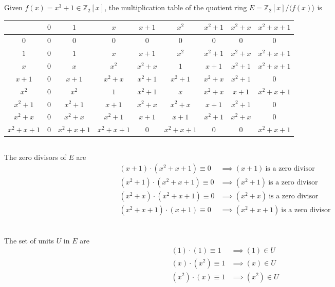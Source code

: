 \documentclass{article}
\begin{document}
\subsection{}
Given $f(x) = x^3 + 1 \in \mathbb{Z}_2[x]$, the multiplication table of the
quotient ring $E = \mathbb{Z}_2[x]/ \langle f(x)\rangle$ is
\begin{center}
\begin{tabular}{ c | c | c | c | c | c | c | c | c }
& $0$ & $1$ & $x$ & $x + 1$ & $x^2$ & $x^2 + 1$ & $x^2 + x$ & $x^2 + x + 1$ \\
\hline
$0$ & $0$ & $0$ & $0$ & $0$ & $0$ & $0$ & $0$ & $0$ \\
\hline
$1$ & $0$ & $1$ & $x$ & $x + 1$ & $x^2$ & $x^2 + 1$ & $x^2 + x$ & $x^2 + x + 1$ \\
\hline
$x$ & $0$ & $x$ & $x^2$ & $x^2 + x$ & $1$ & $x + 1$ & $x^2 + 1$ & $x^2 + x + 1$ \\
\hline
$x+1$ & $0$ & $x+1$ & $x^2 + x$ & $x^2 + 1$ & $x^2 + 1$ & $x^2 + x$ & $x^2 + 1$ & $0$ \\
\hline
$x^2$ & $0$ & $x^2$ & $1$ & $x^2 + 1$ & $x$ & $x^2 + x$ & $x + 1$ & $x^2 + x + 1$ \\
\hline
$x^2 + 1$ & $0$ & $x^2 + 1$ & $x+1$ & $x^2 + x$ & $x^2+x$ & $x + 1$ & $x^2 + 1$ & $0$ \\
\hline
$x^2 + x$ & $0$ & $x^2 + x$ & $x^2+1$ & $x + 1$ & $x+1$ & $x^2 + 1$ & $x^2 + x$ & $0$ \\
\hline
$x^2 + x + 1$ & $0$ & $x^2 + x + 1$ & $x^2+x+1$ & $0$ & $x^2+x+1$ & $0$ & $0$ & $x^2+x+1$ \\
\end{tabular}
\end{center}
\subsection{}
The zero divisors of $E$ are
\[
\begin{split}
(x+1) \cdot (x^2+x+1) \equiv 0 &\implies (x+1)\ \textrm{is a zero divisor} \\
(x^2+1) \cdot (x^2+x+1) \equiv 0 &\implies (x^2+1)\ \textrm{is a zero divisor} \\
(x^2+x) \cdot (x^2+x+1) \equiv 0 &\implies (x^2+x)\ \textrm{is a zero divisor} \\
(x^2+x+1) \cdot (x+1) \equiv 0 &\implies (x^2+x+1)\ \textrm{is a zero divisor} \\
\end{split}
\]
\subsection{}
The set of units $U$ in $E$ are
\[
\begin{split}
(1)\cdot(1) \equiv 1 &\implies (1) \in U \\
(x)\cdot(x^2) \equiv 1 &\implies (x) \in U \\
(x^2)\cdot(x) \equiv 1 &\implies (x^2) \in U \\
\end{split}
\]
\end{document}
